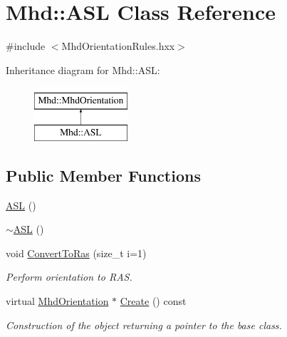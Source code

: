 \hypertarget{classMhd_1_1ASL}{\section{\-Mhd\-:\-:\-A\-S\-L \-Class \-Reference}
\label{classMhd_1_1ASL}
}


{\ttfamily \#include $<$\-Mhd\-Orientation\-Rules.\-hxx$>$}

\-Inheritance diagram for \-Mhd\-:\-:\-A\-S\-L\-:\begin{figure}[H]
\begin{center}
\leavevmode
\includegraphics[height=2.000000cm]{classMhd_1_1ASL}
\end{center}
\end{figure}
\subsection*{\-Public \-Member \-Functions}
\begin{DoxyCompactItemize}
\item 
\hyperlink{classMhd_1_1ASL_a3bad9b510c46c9be6200020c2fff3047}{\-A\-S\-L} ()
\item 
\hyperlink{classMhd_1_1ASL_a15d5fe52fac41f5a52c0c8877546335c}{$\sim$\-A\-S\-L} ()
\item 
void \hyperlink{classMhd_1_1ASL_aeea608fdcf78a9c340dfa6cd01c69a43}{\-Convert\-To\-Ras} (size\-\_\-t i=1)
\begin{DoxyCompactList}\small\item\em \-Perform orientation to \-R\-A\-S. \end{DoxyCompactList}\item 
virtual \hyperlink{classMhd_1_1MhdOrientation}{\-Mhd\-Orientation} $\ast$ \hyperlink{classMhd_1_1ASL_a3d07144eaf5369a16c7ece3d43a80a0b}{\-Create} () const 
\begin{DoxyCompactList}\small\item\em \-Construction of the object returning a pointer to the base class. \end{DoxyCompactList}\end{DoxyCompactItemize}


